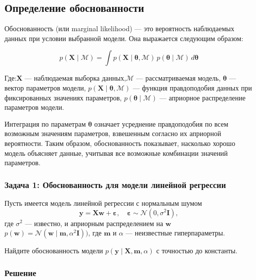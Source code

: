\subsection{Определение обоснованности}

Обоснованность (или marginal likelihood) — это вероятность наблюдаемых данных при условии выбранной модели. Она выражается следующим образом:

\begin{equation}
    p(\mathbf{X} \mid \mathcal{M}) = \int p(\mathbf{X} \mid \boldsymbol{\theta}, \mathcal{M}) \, p(\boldsymbol{\theta} \mid \mathcal{M}) \, d\boldsymbol{\theta}
\end{equation}

Где:$\mathbf{X}$ — наблюдаемая выборка данных,$\mathcal{M}$ — рассматриваемая модель, $\boldsymbol{\theta}$ — вектор параметров модели, $p(\mathbf{X} \mid \boldsymbol{\theta}, \mathcal{M})$ — функция правдоподобия данных при фиксированных значениях параметров, $p(\boldsymbol{\theta} \mid \mathcal{M})$ — априорное распределение параметров модели.

Интеграция по параметрам $\boldsymbol{\theta}$ означает усреднение правдоподобия по всем возможным значениям параметров, взвешенным согласно их априорной вероятности. Таким образом, обоснованность показывает, насколько хорошо модель объясняет данные, учитывая все возможные комбинации значений параметров.

\subsubsection{Задача 1: Обоснованность для модели линейной регрессии}
Пусть имеется модель линейной регрессии с нормальным шумом
\begin{equation*}
    \mathbf{y} = \mathbf{X}\mathbf{w} + \boldsymbol{\varepsilon}, \quad \boldsymbol{\varepsilon} \sim \mathcal{N}(0, \sigma^2 \mathbf{I}),
\end{equation*}
где $\sigma^2$ --- известно, и априорным распределением на $\mathbf{w}$ $p(\mathbf{w}) = \mathcal{N}(\mathbf{w} \mid \mathbf{m}, \alpha^2 \mathbf{I}))$, где $\mathbf{m}$ и $\alpha$ ---
неизвестные гиперпараметры.

Найдите обоснованность модели $p(\mathbf{y} \mid \mathbf{X}, \mathbf{m}, \alpha)$ с точностью до константы.

\subsubsection*{Решение}

